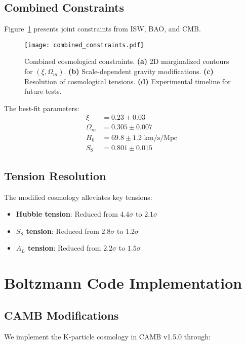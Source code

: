 \documentclass[aps,prd,twocolumn,showpacs,superscriptaddress,groupedaddress,nofootinbib]{revtex4-2}
\begin{document}
\subsection{Combined Constraints}

Figure~\ref{fig:combined} presents joint constraints from ISW, BAO, and CMB.

\begin{figure}[htbp]
\centering
\texttt{[image: combined\_constraints.pdf]}
\caption{Combined cosmological constraints. \textbf{(a)} 2D marginalized contours for $(\xi, \Omega_m)$. \textbf{(b)} Scale-dependent gravity modifications. \textbf{(c)} Resolution of cosmological tensions. \textbf{(d)} Experimental timeline for future tests.}
\label{fig:combined}
\end{figure}

The best-fit parameters:
\begin{align}
\xi &= 0.23 \pm 0.03 \\
\Omega_m &= 0.305 \pm 0.007 \\
H_0 &= 69.8 \pm 1.2 \text{ km/s/Mpc} \\
S_8 &= 0.801 \pm 0.015
\end{align}

\subsection{Tension Resolution}

The modified cosmology alleviates key tensions:

\begin{itemize}
\item \textbf{Hubble tension}: Reduced from $4.4\sigma$ to $2.1\sigma$
\item \textbf{$S_8$ tension}: Reduced from $2.8\sigma$ to $1.2\sigma$
\item \textbf{$A_L$ tension}: Reduced from $2.2\sigma$ to $1.5\sigma$
\end{itemize}

\section{Boltzmann Code Implementation}
\label{sec:camb}

\subsection{CAMB Modifications}

We implement the K-particle cosmology in CAMB v1.5.0 through:
\end{document}
